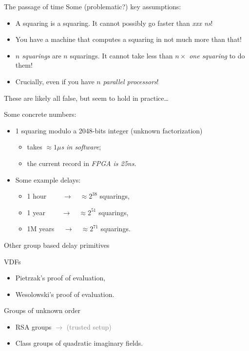\documentclass[aspectratio=169]{beamer}
\begin{document}
\begin{frame}{The passage of time}
  Some (problematic?) key assumptions:
  \begin{itemize}
  \item A squaring is a squaring. It cannot possibly go faster than \emph{xxx ns}!
  \item You have a machine that computes a squaring in not much
    more than that!
  \item \emph{$n$ squarings} are $n$ squarings. It cannot take less
    than \emph{$n \times $ one squaring} to do them!
  \item Crucially, even if you have $n$ \emph{parallel processors}!
  \end{itemize}
  These are likely all false, but seem to hold in practice\dots
  
  \medskip\pause

  Some concrete numbers:
  \begin{itemize}
  \item 1 squaring modulo a 2048-bits integer (unknown factorization)
    \begin{itemize}
    \item takes \emph{$\approx 1\mu$s in software};
    \item the current record in \emph{FPGA is 25ns}.
    \end{itemize}
  \item Some example delays:
    \begin{itemize}
    \item 1 hour $\qquad\rightarrow\quad\approx 2^{38}$ squarings,
    \item 1 year $\qquad\rightarrow\quad\approx 2^{51}$ squarings,
    \item 1M years $\quad\rightarrow\quad\approx 2^{71}$ squarings.
    \end{itemize}
  \end{itemize}
\end{frame}


\begin{frame}{Other group based delay primitives}
  \large
  
  \begin{block}{VDFs}
    \begin{itemize}
    \item Pietrzak's proof of evaluation,
    \item Wesolowski's proof of evaluation.
    \end{itemize}
  \end{block}

  \bigskip
  
  \begin{block}{Groups of unknown order}
    \begin{itemize}
    \item RSA groups \textcolor{gray}{$\to$ (trusted setup)}
    \item Class groups of quadratic imaginary fields.
    \end{itemize}
  \end{block}
\end{frame}
\end{document}
